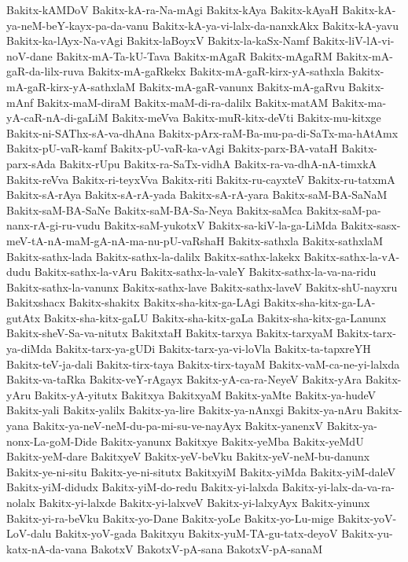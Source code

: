 {Bakitx-kAMDoV
Bakitx-kA-ra-Na-mAgi
Bakitx-kAya
Bakitx-kAyaH
Bakitx-kA-ya-neM-beY-kayx-pa-da-vanu
Bakitx-kA-ya-vi-lalx-da-nanxkAkx
Bakitx-kA-yavu
Bakitx-ka-lAyx-Na-vAgi
Bakitx-laBoyxV
Bakitx-la-kaSx-Namf
Bakitx-liV-lA-vi-noV-dane
Bakitx-mA-Ta-kU-Tava
Bakitx-mAgaR
Bakitx-mAgaRM
Bakitx-mA-gaR-da-lilx-ruva
Bakitx-mA-gaRkekx
Bakitx-mA-gaR-kirx-yA-sathxla
Bakitx-mA-gaR-kirx-yA-sathxlaM
Bakitx-mA-gaR-vanunx
Bakitx-mA-gaRvu
Bakitx-mAnf
Bakitx-maM-diraM
Bakitx-maM-di-ra-dalilx
Bakitx-matAM
Bakitx-ma-yA-caR-nA-di-gaLiM
Bakitx-meVva
Bakitx-muR-kitx-deVti
Bakitx-mu-kitxge
Bakitx-ni-SAThx-sA-va-dhAna
Bakitx-pArx-raM-Ba-mu-pa-di-SaTx-ma-hAtAmx
Bakitx-pU-vaR-kamf
Bakitx-pU-vaR-ka-vAgi
Bakitx-parx-BA-vataH
Bakitx-parx-sAda
Bakitx-rUpu
Bakitx-ra-SaTx-vidhA
Bakitx-ra-va-dhA-nA-timxkA
Bakitx-reVva
Bakitx-ri-teyxVva
Bakitx-riti
Bakitx-ru-cayxteV
Bakitx-ru-tatxmA
Bakitx-sA-rAya
Bakitx-sA-rA-yada
Bakitx-sA-rA-yara
Bakitx-saM-BA-SaNaM
Bakitx-saM-BA-SaNe
Bakitx-saM-BA-Sa-Neya
Bakitx-saMca
Bakitx-saM-pa-nanx-rA-gi-ru-vudu
Bakitx-saM-yukotxV
Bakitx-sa-kiV-la-ga-LiMda
Bakitx-sasx-meV-tA-nA-maM-gA-nA-ma-nu-pU-vaRshaH
Bakitx-sathxla
Bakitx-sathxlaM
Bakitx-sathx-lada
Bakitx-sathx-la-dalilx
Bakitx-sathx-lakekx
Bakitx-sathx-la-vA-dudu
Bakitx-sathx-la-vAru
Bakitx-sathx-la-valeY
Bakitx-sathx-la-va-na-ridu
Bakitx-sathx-la-vanunx
Bakitx-sathx-lave
Bakitx-sathx-laveV
Bakitx-shU-nayxru
Bakitxshacx
Bakitx-shakitx
Bakitx-sha-kitx-ga-LAgi
Bakitx-sha-kitx-ga-LA-gutAtx
Bakitx-sha-kitx-gaLU
Bakitx-sha-kitx-gaLa
Bakitx-sha-kitx-ga-Lanunx
Bakitx-sheV-Sa-va-nitutx
BakitxtaH
Bakitx-tarxya
Bakitx-tarxyaM
Bakitx-tarx-ya-diMda
Bakitx-tarx-ya-gUDi
Bakitx-tarx-ya-vi-loVla
Bakitx-ta-tapxreYH
Bakitx-teV-ja-dali
Bakitx-tirx-taya
Bakitx-tirx-tayaM
Bakitx-vaM-ca-ne-yi-lalxda
Bakitx-va-taRka
Bakitx-veY-rAgayx
Bakitx-yA-ca-ra-NeyeV
Bakitx-yAra
Bakitx-yAru
Bakitx-yA-yitutx
Bakitxya
BakitxyaM
Bakitx-yaMte
Bakitx-ya-hudeV
Bakitx-yali
Bakitx-yalilx
Bakitx-ya-lire
Bakitx-ya-nAnxgi
Bakitx-ya-nAru
Bakitx-yana
Bakitx-ya-neV-neM-du-pa-mi-su-ve-nayAyx
Bakitx-yanenxV
Bakitx-ya-nonx-La-goM-Dide
Bakitx-yanunx
Bakitxye
Bakitx-yeMba
Bakitx-yeMdU
Bakitx-yeM-dare
BakitxyeV
Bakitx-yeV-beVku
Bakitx-yeV-neM-bu-danunx
Bakitx-ye-ni-situ
Bakitx-ye-ni-situtx
BakitxyiM
Bakitx-yiMda
Bakitx-yiM-daleV
Bakitx-yiM-didudx
Bakitx-yiM-do-redu
Bakitx-yi-lalxda
Bakitx-yi-lalx-da-va-ra-nolalx
Bakitx-yi-lalxde
Bakitx-yi-lalxveV
Bakitx-yi-lalxyAyx
Bakitx-yinunx
Bakitx-yi-ra-beVku
Bakitx-yo-Dane
Bakitx-yoLe
Bakitx-yo-Lu-mige
Bakitx-yoV-LoV-dalu
Bakitx-yoV-gada
Bakitxyu
Bakitx-yuM-TA-gu-tatx-deyoV
Bakitx-yu-katx-nA-da-vana
BakotxV
BakotxV-pA-sana
BakotxV-pA-sanaM
}
